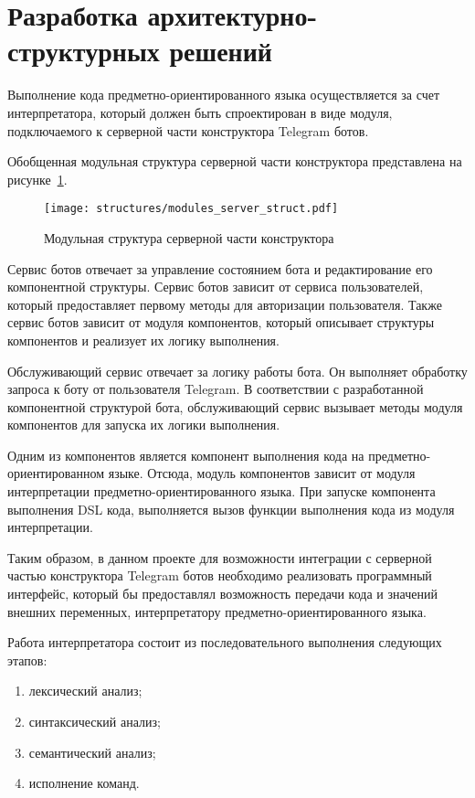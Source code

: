 \newpage

\section{Разработка архитектурно-структурных решений}

Выполнение кода предметно-ориентированного языка осуществляется за счет интерпретатора,
который должен быть спроектирован в виде модуля, подключаемого к серверной части конструктора Telegram ботов.

Обобщенная модульная структура серверной части конструктора представлена на рисунке~\ref{f:modules_server_struct}.

\begin{figure}[ht]
	\centering
	\vspace{\toppaddingoffigure}
	\texttt{[image: structures/modules\_server\_struct.pdf]}
	\caption{Модульная структура серверной части конструктора}
	\label{f:modules_server_struct}
\end{figure}

Сервис ботов отвечает за управление состоянием бота и редактирование его компонентной структуры.
Сервис ботов зависит от сервиса пользователей, который предоставляет первому методы для авторизации пользователя.
Также сервис ботов зависит от модуля компонентов, который описывает структуры компонентов и реализует их логику выполнения.

Обслуживающий сервис отвечает за логику работы бота. 
Он выполняет обработку запроса к боту от пользователя Telegram.
В соответствии с разработанной компонентной структурой бота, обслуживающий сервис вызывает методы модуля компонентов для запуска их логики выполнения.

Одним из компонентов является компонент выполнения кода на предметно-ориентированном языке.
Отсюда, модуль компонентов зависит от модуля интерпретации предметно-ориентированного языка.
При запуске компонента выполнения DSL кода, выполняется вызов функции выполнения кода из модуля интерпретации.

Таким образом, в данном проекте для возможности интеграции с серверной частью конструктора Telegram ботов необходимо реализовать программный интерфейс,
который бы предоставлял возможность передачи кода и значений внешних переменных, интерпретатору предметно-ориентированного языка.

Работа интерпретатора состоит из последовательного выполнения следующих этапов:
\begin{enumerate}
	\item лексический анализ;
	\item синтаксический анализ;
	\item семантический анализ;
	\item исполнение команд.
\end{enumerate}

